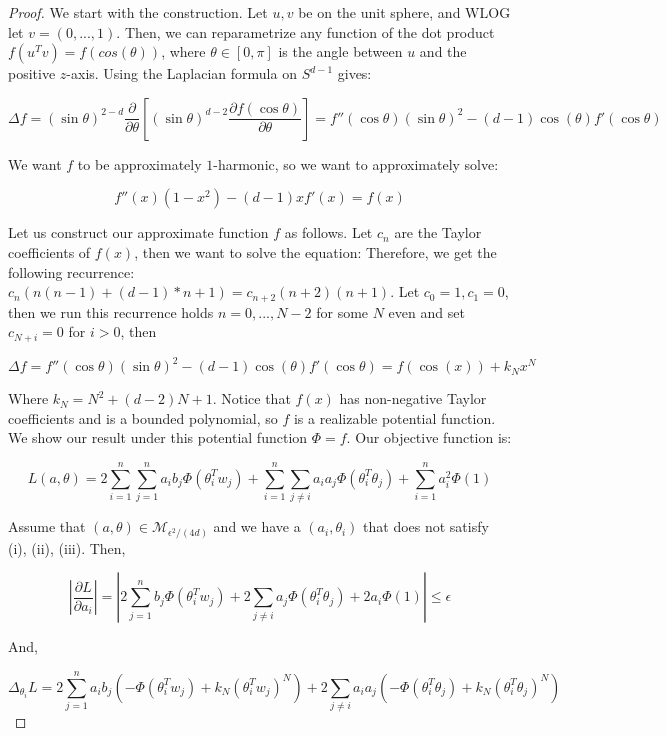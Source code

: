 \documentclass[11pt]{article}
\newcommand{\pd}[2]{\frac{\partial#1}{\partial#2}}
\begin{document}
\begin{proof}
We start with the construction. Let $u,v$ be on the unit sphere, and WLOG let $v = (0,...,1)$. Then, we can reparametrize any function of the dot product $f(u^Tv) = f(cos(\theta))$, where $\theta \in [0, \pi]$ is the angle between $u$ and the positive $z$-axis.
Using the Laplacian formula on $S^{d-1}$ gives:

\[\Delta f = (\sin \theta)^{2-d} \frac{\partial}{\partial \theta}\left[ (\sin \theta)^{d-2} \frac{\partial f(\cos \theta)}{\partial \theta}\right] = f''(\cos\theta)(\sin \theta)^{2} - (d-1)\cos(\theta)f'(\cos\theta)\]

We want $f$ to be approximately $1$-harmonic, so we want to approximately solve:

\[f''(x)(1-x^2) - (d-1)xf'(x) =  f(x) \]

Let us construct our approximate function $f$ as follows. Let $c_n$ are the Taylor coefficients of $f(x)$, then we want to solve the equation:
Therefore, we get the following recurrence: $c_n (n(n-1) + (d-1)*n + 1) = c_{n+2} (n+2)(n+1)$. Let $c_0 = 1, c_1 = 0$, then we run this recurrence holds $n=0,...,N-2$ for some $N$ even and set $c_{N+i} = 0$ for $i > 0$, then

\[\Delta f = f''(\cos\theta)(\sin \theta)^{2} - (d-1)\cos(\theta)f'(\cos\theta) = f(\cos(x)) + k_Nx^N\]

Where $k_N = N^2 + (d-2)N + 1$. Notice that $f(x)$ has non-negative Taylor coefficients and is a bounded polynomial, so $f$ is a realizable potential function. \\

We show our result under this potential function $\Phi = f$. Our objective function is:

\[L(a, \theta) = 2\sum_{i=1}^n \sum_{j=1}^n a_i b_j \Phi(\theta_i^T w_j) + \sum_{i=1}^n \sum_{j\neq i} a_i a_j\Phi(\theta_i^T\theta_j)  +\sum_{i=1}^n a_i^2\Phi(1)  \]

Assume that $(a, \theta) \in \mathcal{M}_{\epsilon^2/(4d)}$ and we have a $(a_i,\theta_i)$ that does not satisfy (i), (ii), (iii). Then,

\[|\pd{L}{a_i}| = |2\sum_{j=1}^n  b_j  \Phi(\theta_i^T w_j) +  2\sum_{j\neq i} a_j \Phi(\theta_i^T\theta_j)  + 2a_i\Phi(1)| \leq \epsilon \] 

And, 

\[\Delta_{\theta_i} L =  2\sum_{j=1}^n a_i b_j  (-\Phi(\theta_i^T w_j) + k_N(\theta_i^Tw_j)^N) +  2\sum_{j\neq i} a_i a_j(-\Phi(\theta_i^T\theta_j) + k_N(\theta_i^T\theta_j)^N)\]


\end{proof}
\end{document}
